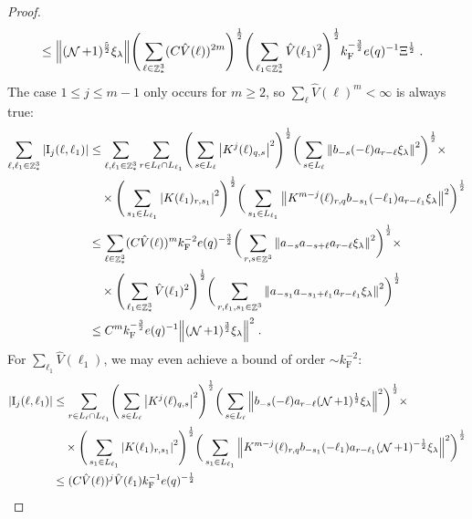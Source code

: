 \documentclass[12pt,a4paper]{article}
\numberwithin{equation}{section}
\newcommand{\1}{\mathbb{I}}
\newcommand{\F}{\mathrm{F}}
\newcommand{\I}{\mathrm{I}}
\DeclareMathOperator{\Z}{\mathbb{Z}}
\DeclareMathOperator{\NN}{\mathcal{N}}
\newcommand{\half}{\frac{1}{2}}
\theoremstyle{plain}
\theoremstyle{definition}
\theoremstyle{remark}
\theoremstyle{plain}
\theoremstyle{definition}
\theoremstyle{remark}
\begin{document}
\begin{proof}
{\begin{align}
 	&\leq \norm{ (\NN+1)^{\frac 52}\xi_\lambda}
 		\Bigg( \sum\limits_{\ell \in \Z^3_*} (C \hat{V}(\ell))^{2m} \Bigg)^{\half}
 		\Bigg( \sum\limits_{\ell_1 \in \Z^3_*} \hat{V}(\ell_1)^2 \Bigg)^{\half}
 		k_{\F}^{-\frac 32} e(q)^{-1} \Xi^{\half} \;. \label{eq:estEQ2111} 
\end{align}}
The case $ 1 \le j \le m-1 $ only occurs for $ m \ge 2 $, so $ \sum_\ell \hat{V}(\ell)^m < \infty $ is always true:
\textcolor{green!30!black}{
\begin{align}
	\sum_{\ell,\ell_1 \in \Z^3_*} |\I_j(\ell, \ell_1)|
	&\leq \sum_{\ell,\ell_1 \in \Z^3_*} \sum\limits_{r\in L_{\ell} \cap L_{\ell_1}}\! \Bigg( \sum\limits_{s \in L_\ell} \abs{K^{j}(\ell)_{q,s}}^2\Bigg)^\half \bigg( \sum\limits_{s \in L_\ell}\norm{b_{-s}(-\ell) a_{r-\ell} \xi_\lambda}^2\bigg)^\half \times\nonumber\\
		&\quad \times \Bigg( \sum\limits_{s_1 \in L_{\ell_1}}\abs{K(\ell_1)_{r,s_1}}^2\Bigg)^\half \bigg(\sum\limits_{s_1 \in L_{\ell_1}}\norm{ K^{m-j}(\ell)_{r,q} b_{-s_1}(-\ell_1)  a_{r-\ell_1} \xi_\lambda }^2\bigg)^\half
	\nonumber\\
	&\leq \sum_{\ell \in \Z^3_*} (C \hat{V}(\ell))^m
		k_{\F}^{-2} e(q)^{-\frac 32}
		\bigg( \sum\limits_{r, s\in \Z^3} \norm{ a_{-s} a_{-s+\ell} a_{r-\ell} \xi_\lambda}^2\bigg)^\half \times \nonumber\\
		&\quad \times 
		\Bigg( \sum_{\ell_1 \in \Z^3_*} \hat{V}(\ell_1)^2 \Bigg)^{\half}
	\bigg(
		\sum\limits_{r, \ell_1, s_1 \in \Z^3} \norm{ a_{-s_1} a_{-s_1 + \ell_1} a_{r-\ell_1} \xi_\lambda }^2\bigg)^\half
	\nonumber\\
	&\leq C^m k_{\F}^{-\frac 32} e(q)^{-1}
	\norm{ (\NN+1)^{\frac 32} \xi_\lambda}^2 \;. \label{eq:estEQ2112_Coulomb}
\end{align}
For $ \sum_{\ell_1} \hat{V}(\ell_1) $, we may even achieve a bound of order $ \sim k_{\F}^{-2} $:}
\begin{align}
	|\I_j(\ell, \ell_1)|
	&\leq \sum\limits_{r\in L_{\ell} \cap L_{\ell_1}}\! \Bigg( \sum\limits_{s \in L_\ell} \abs{K^{j}(\ell)_{q,s}}^2\Bigg)^\half \bigg( \sum\limits_{s \in L_\ell}\norm{b_{-s}(-\ell) a_{r-\ell} (\NN+1)^{\half}\xi_\lambda}^2\bigg)^\half \times\nonumber\\
		&\quad \times \Bigg( \sum\limits_{s_1 \in L_{\ell_1}}\abs{K(\ell_1)_{r,s_1}}^2\Bigg)^\half \bigg(\sum\limits_{s_1 \in L_{\ell_1}}\norm{ K^{m-j}(\ell)_{r,q} b_{-s_1}(-\ell_1)  a_{r-\ell_1} (\NN+1)^{-\half}\xi_\lambda }^2\bigg)^\half
	\nonumber\\
	&\leq (C \hat{V}(\ell))^j \hat{V}(\ell_1) k_{\F}^{-1} e(q)^{-\half}

\end{align}
\end{proof}
\end{document}
